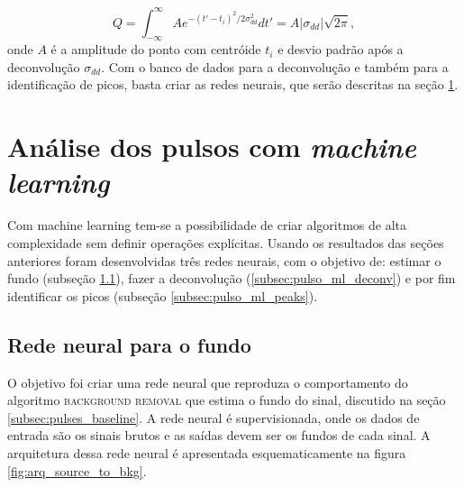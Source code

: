 \documentclass[a4paper,12pt,oneside]{book}
\begin{document}

\begin{equation}\label{eq:gauss_area}
    Q = \int^\infty _{-\infty} Ae^{-(t' - t_i)^2 / 2\sigma_{dd}^2} dt' = A\left |\sigma_{dd} \right|\sqrt{2\pi},
\end{equation}
%
onde $A$ é a amplitude do ponto com centróide $t_i$ e desvio padrão após a deconvolução $\sigma_{dd}$. Com o banco de dados para a deconvolução e também para a identificação de picos, basta criar as redes neurais, que serão descritas na seção \ref{sec:pulsos_ml}.

\section{Análise dos pulsos com \textit{machine learning}}\label{sec:pulsos_ml}

\par Com machine learning tem-se a possibilidade de criar algoritmos de alta complexidade sem definir operações explícitas. Usando os resultados das seções anteriores foram desenvolvidas três redes neurais, com o objetivo de: estimar o fundo (subseção \ref{subsec:pulso_ml_fundo}), fazer a deconvolução (\ref{subsec:pulso_ml_deconv}) e por fim identificar os picos (subseção \ref{subsec:pulso_ml_peaks}). 


\subsection{Rede neural para o fundo}\label{subsec:pulso_ml_fundo}

\par O objetivo foi criar uma rede neural que reproduza o comportamento do algoritmo \textsc{background removal} que estima o fundo do sinal, discutido na seção \ref{subsec:pulses_baseline}. A rede neural é supervisionada, onde os dados de entrada são os sinais brutos e as saídas devem ser os fundos de cada sinal. A arquitetura dessa rede neural é apresentada esquematicamente na figura \ref{fig:arq_source_to_bkg}.
\end{document}
